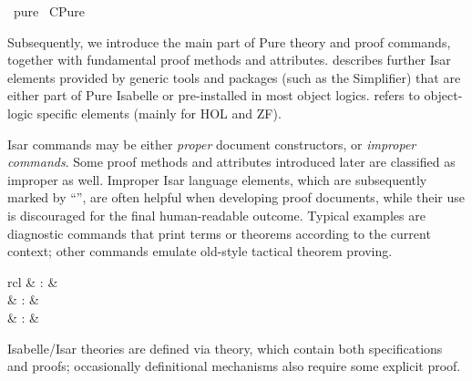 %
\begin{isabellebody}%
\def\isabellecontext{pure}%
%
\isadelimtheory
\isanewline
\isanewline
%
\endisadelimtheory
%
\isatagtheory
{}\isamarkupfalse%
\ pure\isanewline
{}\ CPure\isanewline
{}%
\endisatagtheory
{\isafoldtheory}%
%
\isadelimtheory
%
\endisadelimtheory
%
\isamarkuptrue%
%
\begin{isamarkuptext}%
Subsequently, we introduce the main part of Pure theory and proof
  commands, together with fundamental proof methods and attributes.
   describes further Isar elements provided by
  generic tools and packages (such as the Simplifier) that are either
  part of Pure Isabelle or pre-installed in most object logics.
   refers to object-logic specific elements (mainly
  for HOL and ZF).

  \medskip Isar commands may be either \emph{proper} document
  constructors, or \emph{improper commands}.  Some proof methods and
  attributes introduced later are classified as improper as well.
  Improper Isar language elements, which are subsequently marked by
  ``\isa{\isactrlsup {\isacharasterisk}}'', are often helpful when developing proof
  documents, while their use is discouraged for the final
  human-readable outcome.  Typical examples are diagnostic commands
  that print terms or theorems according to the current context; other
  commands emulate old-style tactical theorem proving.%
\end{isamarkuptext}%
\isamarkuptrue%
%
\isamarkuptrue%
%
\isamarkuptrue%
%
\begin{isamarkuptext}%
\begin{matharray}{rcl}
    \mbox{} & : &  \\
    \mbox{} & : &  \\
    \mbox{} & : &  \\
  \end{matharray}

  Isabelle/Isar theories are defined via theory, which contain both
  specifications and proofs; occasionally definitional mechanisms also
  require some explicit proof.


\end{isamarkuptext}
\end{isabellebody}
